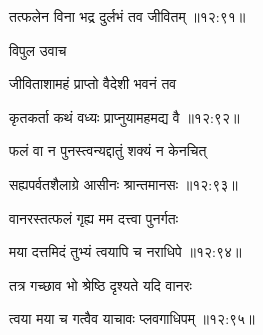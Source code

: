 
{\devanagarifont तत्फलेन विना भद्र दुर्लभं तव जीवितम् {॥१२:९१॥} \veg\dontdisplaylinenum }%
 
{\devanagarifont विपुल उवाच {\dandab}\dontdisplaylinenum  }%
 
{\devanagarifont जीविताशामहं प्राप्तो वैदेशी भवनं तव \thinspace{\danda} \dontdisplaylinenum }%


{\devanagarifont कृतकर्ता कथं वध्यः प्राप्नुयामहमद्य वै {॥१२:९२॥} \veg\dontdisplaylinenum }%

{\devanagarifont फलं वा न पुनस्त्वन्यद्दातुं शक्यं न केनचित् \thinspace{\dandab} \dontdisplaylinenum }%


{\devanagarifont सह्यपर्वतशैलाग्रे आसीनः श्रान्तमानसः {॥१२:९३॥} \veg\dontdisplaylinenum }%

{\devanagarifont वानरस्तत्फलं गृह्य मम दत्त्वा पुनर्गतः \thinspace{\dandab} \dontdisplaylinenum }%


{\devanagarifont मया दत्तमिदं तुभ्यं त्वयापि च नराधिपे {॥१२:९४॥} \veg\dontdisplaylinenum }%

{\devanagarifont तत्र गच्छाव भो श्रेष्ठि दृश्यते यदि वानरः \thinspace{\dandab} \dontdisplaylinenum }%
 

{\devanagarifont त्वया मया च गत्वैव याचावः प्लवगाधिपम् {॥१२:९५॥} \veg\dontdisplaylinenum }%

